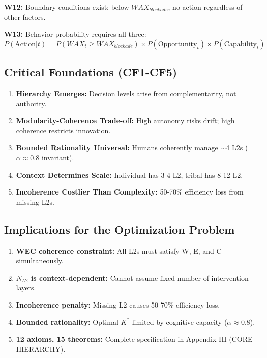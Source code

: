 \textbf{W12:} Boundary conditions exist: below $WAX_{blockade}$, no action regardless of other factors.

\textbf{W13:} Behavior probability requires all three:
\begin{equation}
P(\text{Action}|t) = P(WAX_t \geq WAX_{blockade}) \times P(\text{Opportunity}_t) \times P(\text{Capability}_t)
\label{eq:mp-action-probability}
\end{equation}

\subsection{Critical Foundations (CF1-CF5)}

\begin{enumerate}[nosep]
\item \textbf{Hierarchy Emerges:} Decision levels arise from complementarity, not authority.
\item \textbf{Modularity-Coherence Trade-off:} High autonomy risks drift; high coherence restricts innovation.
\item \textbf{Bounded Rationality Universal:} Humans coherently manage $\sim$4 L2s ($\alpha \approx 0.8$ invariant).
\item \textbf{Context Determines Scale:} Individual has 3-4 L2, tribal has 8-12 L2.
\item \textbf{Incoherence Costlier Than Complexity:} 50-70\% efficiency loss from missing L2s.
\end{enumerate}

\subsection{Implications for the Optimization Problem}

\begin{enumerate}[nosep]
\item \textbf{WEC coherence constraint:} All L2s must satisfy W, E, and C simultaneously.
\item \textbf{$N_{L2}$ is context-dependent:} Cannot assume fixed number of intervention layers.
\item \textbf{Incoherence penalty:} Missing L2 causes 50-70\% efficiency loss.
\item \textbf{Bounded rationality:} Optimal $K^*$ limited by cognitive capacity ($\alpha \approx 0.8$).
\item \textbf{12 axioms, 15 theorems:} Complete specification in Appendix HI (CORE-HIERARCHY).
\end{enumerate}

